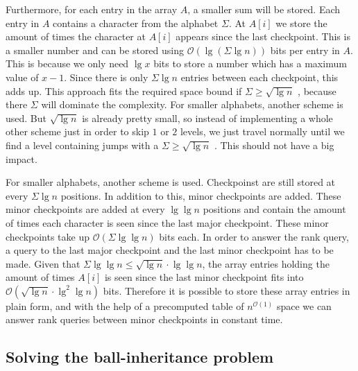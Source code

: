 Furthermore, for each entry in the array $A$, a smaller sum will be stored. Each entry in $A$ contains a character from the alphabet $\Sigma$. At $A[i]$ we store the amount of times the character at $A[i]$ appears since the last checkpoint. This is a smaller number and can be stored using $\mathcal{O}(\lg (\Sigma \lg n))$ bits per entry in $A$. This is because we only need $\lg x$ bits to store a number which has a maximum value of $x-1$. Since there is only $\Sigma \lg n$ entries between each checkpoint, this adds up. This approach fits the required space bound if $\Sigma \geq \sqrt{\lg n}$ , because there $\Sigma$ will dominate the complexity. For smaller alphabets, another scheme is used. But $\sqrt{\lg n}$ is already pretty small, so instead of implementing a whole other scheme just in order to skip $1$ or $2$ levels, we just travel normally until we find a level containing jumps with a $\Sigma \geq \sqrt{\lg n}$ . This should not have a big impact. 

For smaller alphabets, another scheme is used. Checkpoinst are still stored at every $\Sigma \lg n$ positions. In addition to this, minor checkpoints are added. These minor checkpoints are added at every $\lg \lg n$ positions and contain the amount of times each character is seen since the last major checkpoint. These minor checkpoints take up $\mathcal{O}(\Sigma \lg \lg n)$ bits each. In order to answer the rank query, a query to the last major checkpoint and the last minor checkpoint has to be made. Given that $\Sigma \lg \lg n \leq \sqrt{\lg n} \cdot \lg \lg n$, the array entries holding the amount of times $A[i]$ is seen since the last minor checkpoint fits into $\mathcal{O}(\sqrt{\lg n} \cdot \lg^2 \lg n)$ bits. Therefore it is possible to store these array entries in plain form, and with the help of a precomputed table of $n^{\mathcal{O}(1)}$ space we can answer rank queries between minor checkpoints in constant time.   


\subsection{Solving the ball-inheritance problem} 
\label{ssection:solving-ball}

